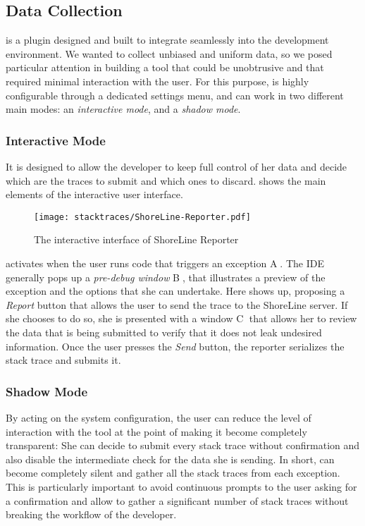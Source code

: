 \subsection{Data Collection}\label{sec:stacktraces-tool}

\slr is a plugin designed and built to integrate seamlessly into the \pha development environment.
We wanted to collect unbiased and uniform data, so we posed particular attention in building a tool that could be unobtrusive and that required minimal interaction with the user.
For this purpose, \slr is highly configurable through a dedicated settings menu, and can work in two different main modes: an \emph{interactive mode}, and a \emph{shadow mode}.

\subsubsection{Interactive Mode}
It is designed to allow the developer to keep full control of her data and decide which are the traces to submit and which ones to discard.
 shows the main elements of the interactive user interface.

\begin{figure}[ht]
\begin{center}
  \texttt{[image: stacktraces/ShoreLine-Reporter.pdf]}
  \caption{The interactive interface of ShoreLine Reporter}
  \label{fig:shoreline-reporter}
\end{center}
\end{figure}

\slr activates when the user runs code that triggers an exception \textcircled{\scriptsize A}.
The \pha IDE generally pops up a \emph{pre-debug window} \textcircled{\scriptsize B}, that illustrates a preview of the exception and the options that she can undertake.
Here \slr shows up, proposing a \emph{Report} button that allows the user to send the trace to the ShoreLine server.
If she chooses to do so, she is presented with a window \textcircled{\scriptsize C} that allows her to review the data that is being submitted to verify that it does not leak undesired information.
Once the user presses the \emph{Send} button, the reporter serializes the stack trace and submits it.

\subsubsection{Shadow Mode}
By acting on the system configuration, the user can reduce the level of interaction with the tool at the point of making it become completely transparent: She can decide to submit every stack trace without confirmation and also disable the intermediate check for the data she is sending.
In short, \slr can become completely silent and gather all the stack traces from each exception.
This is particularly important to avoid continuous prompts to the user asking for a confirmation and allow \slr to gather a significant number of stack traces without breaking the workflow of the developer.


